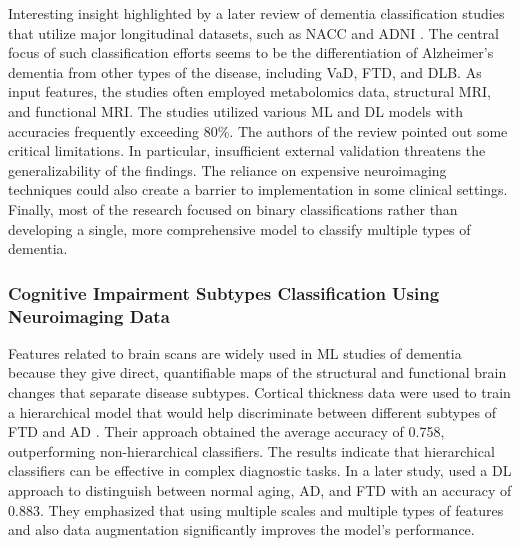 Interesting insight highlighted by a later review of dementia classification studies that utilize major longitudinal datasets, such as NACC and ADNI \cite{Wang2024Understanding}. The central focus of such classification efforts seems to be the differentiation of Alzheimer’s dementia from other types of the disease, including VaD, FTD, and DLB. As input features, the studies often employed metabolomics data, structural MRI, and functional MRI. The studies utilized various ML and DL models with accuracies frequently exceeding 80\%. The authors of the review pointed out some critical limitations. In particular, insufficient external validation threatens the generalizability of the findings. The reliance on expensive neuroimaging techniques could also create a barrier to implementation in some clinical settings. Finally, most of the research focused on binary classifications rather than developing a single, more comprehensive model to classify multiple types of dementia.

\subsubsection{Cognitive Impairment Subtypes Classification Using Neuroimaging Data}
Features related to brain scans are widely used in ML studies of dementia because they give direct, quantifiable maps of the structural and functional brain changes that separate disease subtypes. Cortical thickness data were used to train a hierarchical model that would help discriminate between different subtypes of FTD and AD \cite{Kim2019Machine}. Their approach obtained the average accuracy of 0.758, outperforming non-hierarchical classifiers. The results indicate that hierarchical classifiers can be effective in complex diagnostic tasks. In a later study,  used a DL approach to distinguish between normal aging, AD, and FTD with an accuracy of 0.883. They emphasized that using multiple scales and multiple types of features and also data augmentation significantly improves the model’s performance. 
 

